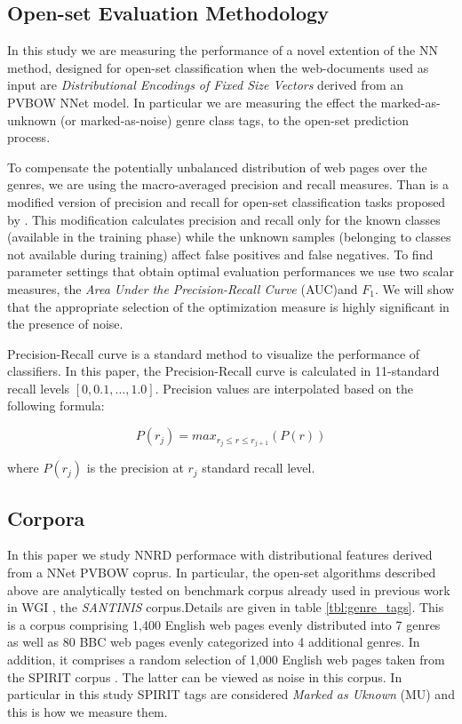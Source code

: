 \documentclass[runningheads]{llncs}
\begin{document}
\subsection{Open-set Evaluation Methodology}
In this study we are measuring the performance of a novel extention of the NN method, designed for open-set classification when the web-documents used as input are \textit{Distributional Encodings of Fixed Size Vectors} derived from an PVBOW NNet model. In particular we are measuring the effect the marked-as-unknown (or marked-as-noise) genre class tags, to the open-set prediction process.

To compensate the potentially unbalanced distribution of web pages over the genres, we are using the macro-averaged precision and recall measures. Than is a modified version of precision and recall for open-set classification tasks proposed by \cite{mendesjunior2016}. This modification calculates precision and recall only for the known classes (available in the training phase) while the unknown samples (belonging to classes not available during training) affect false positives and false negatives. To find parameter settings that obtain optimal evaluation performances we use two scalar measures, the \textit{Area Under the Precision-Recall Curve} (AUC)and $F_{1}$. We will show that the appropriate selection of the optimization measure is highly significant in the presence of noise.

Precision-Recall curve is a standard method to visualize the performance of classifiers. In this paper, the Precision-Recall curve is calculated in 11-standard recall levels $[0,0.1,...,1.0]$. Precision values are interpolated based on the following formula:

\begin{equation}
	P(r_j)=max_{r_j \leqslant r \leqslant r_{j+1}}(P(r))
\end{equation}

\noindent
where $P(r_j)$ is the precision at $r_j$ standard recall level.

\subsection{Corpora}\label{sec:corpora}
In this paper we study NNRD performace with distributional features derived from a NNet PVBOW coprus. In particular, the open-set algorithms described above are analytically tested on benchmark corpus already used in previous work in WGI \citep{meyer2004genre,santini2007automatic,kanaris2009learning,pritsos2018open}, the \textit{SANTINIS} \cite{mehler2010genres_on_web} corpus.Details are given in table \ref{tbl:genre_tags}. This is a corpus comprising 1,400 English web pages evenly distributed into 7 genres as well as 80 BBC web pages evenly categorized into 4 additional genres. In addition, it comprises a random selection of 1,000 English web pages taken from the SPIRIT corpus \cite{joho2004spirit}. The latter can be viewed as noise in this corpus. In particular in this study SPIRIT tags are considered \textit{Marked as Uknown} (MU) and this is how we measure them.
\end{document}
